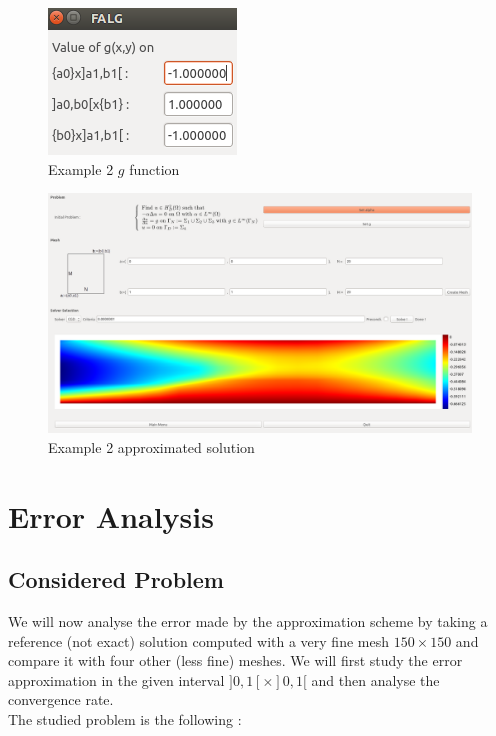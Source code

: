 \documentclass[a4paper]{report}
\begin{document}
\begin{figure}[H]
\begin{center}
\includegraphics[scale=0.50]{example_2_g.png}\caption{Example 2 $g$ function}
\end{center}
\end{figure}


\begin{figure}[H]
\begin{center}
\includegraphics[scale=0.23]{example_2_solution.png}\caption{Example 2 approximated solution}
\end{center}
\end{figure}
\newpage


\chapter{Error Analysis}
\section{Considered Problem}
We will now analyse the error made by the approximation scheme by taking a reference (not exact) solution computed with a very fine mesh $150 \times 150$ and compare it with four other (less fine) meshes. We will first study the error approximation in the given interval $]0,1[ \times ]0,1[$ and then analyse the convergence rate.
\\
The studied problem is the following :
\end{document}
